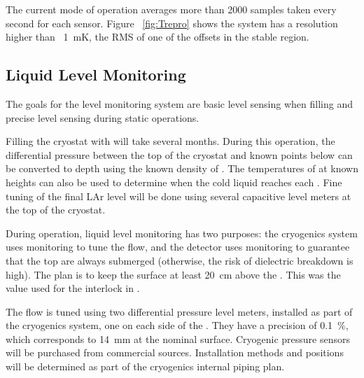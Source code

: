 The current mode of operation averages more than 2000 samples taken every second for each sensor. 
Figure ~\ref{fig:Trepro} shows the system has a resolution higher than \
\SI{1}{mK}, the RMS of one of the offsets in the stable region.


\subsection{Liquid Level Monitoring}

The goals for the \lar level monitoring system are basic level sensing when filling and precise level sensing during static operations. 

Filling the cryostat with \lar will take several months. During this operation, 
the differential pressure between the top of
the cryostat and known points below can be converted to depth using
the known density of \lar.  The temperatures of \dwords{rtd} at known
heights can also be used to determine when the cold liquid reaches 
each \dword{rtd}. Fine tuning of the final LAr level will be done using 
several capacitive level meters at the top of the cryostat. 

During operation, liquid level monitoring has two purposes:
the cryogenics system uses monitoring to tune the \lar flow, and 
the detector uses monitoring to guarantee that the top \dwords{gp} are always
submerged (otherwise, the risk of dielectric breakdown is high). The plan is to keep the \lar surface at least \SI{20}{cm} above the . This was the value used for the  interlock in . 

The \lar flow 
is tuned using two differential pressure level meters, installed as part of the cryogenics system, one on each side of the .  They 
have a precision of \SI{0.1}{\%}, which corresponds to \SI{14}{mm} at the
nominal \lar surface. Cryogenic pressure sensors will be purchased from commercial sources. Installation methods and positions will be determined as part of the
cryogenics internal piping plan.  


